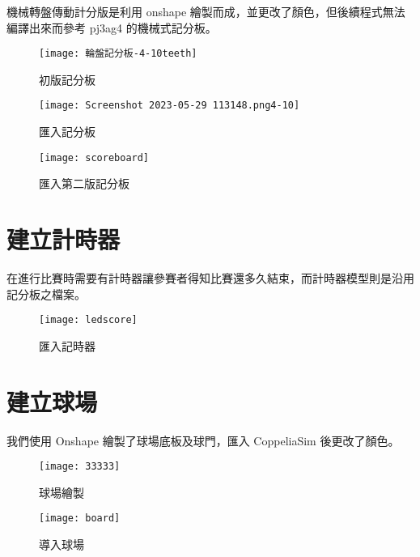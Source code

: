 機械轉盤傳動計分版是利用 onshape 繪製而成，並更改了顏色，但後續程式無法編譯出來而參考 pj3ag4 的機械式記分板。\\
\begin{figure}[hbt!]
\begin{center}
\texttt{[image: 輪盤記分板-4-10teeth]}
\caption{\Large 初版記分板}\label{初版記分板}
\end{center}
\end{figure}
\begin{figure}[hbt!]
\begin{center}
\texttt{[image: Screenshot 2023-05-29 113148.png4-10]}
\caption{\Large 匯入記分板}\label{匯入記分板}
\end{center}
\end{figure}
\begin{figure}[hbt!]
\begin{center}
\texttt{[image: scoreboard]}
\caption{\Large 匯入第二版記分板}\label{匯入第二版記分板}
\end{center}
\end{figure}

\section{建立計時器}
在進行比賽時需要有計時器讓參賽者得知比賽還多久結束，而計時器模型則是沿用記分板之檔案。\\
\begin{figure}[hbt!]
\begin{center}
\texttt{[image: ledscore]}
\caption{\Large 匯入記時器}\label{匯入記時器}
\end{center}
\end{figure}

\section{建立球場}
我們使用 Onshape 繪製了球場底板及球門，匯入 CoppeliaSim 後更改了顏色。\\
\begin{figure}[hbt!]
\begin{center}
\texttt{[image: 33333]}
\caption{\Large 球場繪製}\label{球場繪製}
\end{center}
\end{figure}
\begin{figure}[hbt!]
\begin{center}
\texttt{[image: board]}
\caption{\Large 導入球場}\label{導入球場}
\end{center}
\end{figure}
\newpage

\renewcommand{\baselinestretch}{0.5} %
